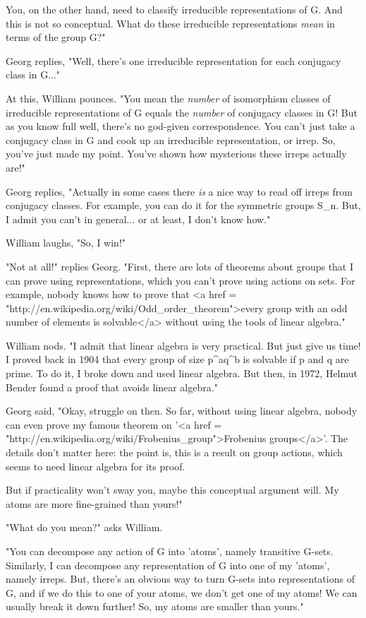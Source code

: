 You, on the other hand, need to classify irreducible representations 
of G.  And this is not so conceptual.  What do these irreducible
representations \emph{mean} in terms of the group G?"

Georg replies, "Well, there's one irreducible representation for
each conjugacy class in G..."

At this, William pounces.  "You mean the \emph{number} of isomorphism
classes of irreducible representations of G equals the \emph{number}
of conjugacy classes in G!  But as you know full well, there's no 
god-given correspondence.  You can't just take a conjugacy class in 
G and cook up an irreducible representation, or irrep.  So, you've 
just made my point.  You've shown how mysterious these irreps actually 
are!"

Georg replies, "Actually in some cases there \emph{is} a nice way to 
read off irreps from conjugacy classes.  For example, you can
do it for the symmetric groups S_{n}.
But, I admit you can't in general... or at least, I don't know how."

William laughs, "So, I win!"

"Not at all!" replies Georg.  "First, there are lots of theorems
about groups that I can prove using representations, which you can't
prove using actions on sets.  For example, nobody knows how to prove
that <a href = "http://en.wikipedia.org/wiki/Odd_order_theorem">every group
with an odd number of elements is solvable</a> without using the tools of linear algebra."

William nods.  "I admit that linear algebra is very practical.
But just give us time!  I proved back in 1904 that every group of size
p^{a}q^{b} is solvable if p and q are prime.  To do
it, I broke down and used linear algebra.  But then, in 1972, Helmut
Bender found a proof that avoids linear algebra."

Georg said, "Okay, struggle on then.  So far, without using linear
algebra, nobody can even prove my famous theorem on '<a href = "http://en.wikipedia.org/wiki/Frobenius_group">Frobenius groups</a>'.
The details don't matter here: the point is, this is a result on 
group actions, which seems to need linear algebra for its proof.  

But if practicality won't sway you, maybe this conceptual argument 
will.  My atoms are more fine-grained than yours!"

"What do you mean?" asks William.

"You can decompose any action of G into 'atoms', namely transitive
G-sets.  Similarly, I can decompose any representation of G into 
one of my 'atoms', namely irreps.  But, there's an obvious way to 
turn G-sets into representations of G, and if we do this to one of
your atoms, we don't get one of my atoms!  We can usually break it down
further!  So, my atoms are smaller than yours."

